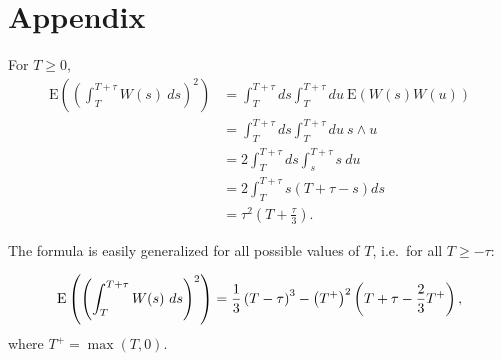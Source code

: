 \documentclass{article}
\begin{document}
\newpage

\appendix{}

\section{Appendix}

For $T\ge 0$, 
\begin{align*}
\mathrm{E}\left( \left( \int_{T}^{T+\tau }W(s)~ds\right) ^{2}\right) &
=\int_{T}^{T+\tau }ds\int_{T}^{T+\tau }du~\mathrm{E}\left( W(s)W(u)\right) \\
& =\int_{T}^{T+\tau }ds\int_{T}^{T+\tau }du~s\wedge u \\
& =2\int_{T}^{T+\tau }ds\int_{s}^{T+\tau }s~du \\
& =2\int_{T}^{T+\tau }s(T+\tau -s)ds \\
& =\tau ^{2}\left( T+\frac{\tau }{3}\right) .
\end{align*}

The formula is easily generalized for all possible values of $T$, i.e.\ for
all $T\ge -\tau$:

\begin{equation*}
\mathrm{E}\left( \left( \int_{T}^{T+\tau }W(s)~ds\right) ^{2}\right) = \frac{%
1}{3}\left(T-\tau\right)^3 - \left(T^+\right)^2\left( T+\tau - \frac{2}{3}
T^+ \right),
\end{equation*}
where $T^+= \max(T,0)$.
\end{document}
